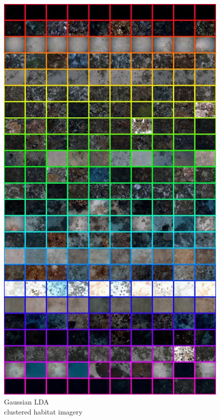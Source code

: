 		\begin{figure}
			\centering
				\includegraphics[width=\linewidth]{Figures/label_images.png}
			\caption{Gaussian LDA \\ clustered habitat imagery \\ \citep{Steinberg2015128}}
			\label{Figure:LabelImages}
		\end{figure}
			
